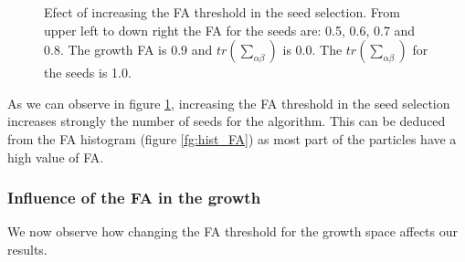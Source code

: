 \documentclass[12pt]{article}
\begin{document}
\begin{figure}[ht]
\begin{minipage}{.45\textwidth}
\end{minipage}
\caption{Efect of increasing the FA threshold in the seed selection. From upper left to down right the FA for the seeds are: 0.5, 0.6, 0.7 and 0.8. The growth FA is 0.9 and $tr \left(\sum_{\alpha\beta}\right)$ is 0.0. The $tr \left(\sum_{\alpha\beta}\right)$ for the seeds is 1.0.} \label{fg:3D_FA_seeds}
\end{figure}
\FloatBarrier

\begin{par}
As we can observe in figure \ref{fg:3D_FA_seeds},
 increasing the FA threshold in the seed selection
  increases strongly the number of seeds for the
   algorithm. This can be deduced from the FA
    histogram (figure \ref{fg:hist_FA}) as most
     part of the particles have a high value of FA.
\end{par}


\subsubsection{Influence of the FA in the growth}
\label{sec:infl_FA_growth}
\begin{par}
We now observe how changing the FA threshold
 for the growth space affects our results. 
\end{par}
\end{document}
